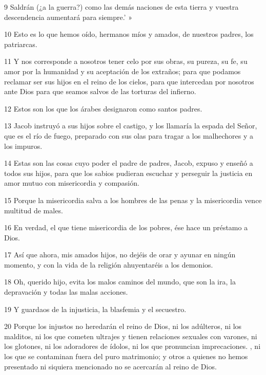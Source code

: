 \par 9 Saldrán (¿a la guerra?) como las demás naciones de esta tierra y vuestra descendencia aumentará para siempre.' »

\par 10 Esto es lo que hemos oído, hermanos míos y amados, de nuestros padres, los patriarcas.

\par 11 Y nos corresponde a nosotros tener celo por sus obras, su pureza, su fe, su amor por la humanidad y su aceptación de los extraños; para que podamos reclamar ser sus hijos en el reino de los cielos, para que intercedan por nosotros ante Dios para que seamos salvos de las torturas del infierno.

\par 12 Estos son los que los árabes designaron como santos padres.

\par 13 Jacob instruyó a sus hijos sobre el castigo, y los llamaría la espada del Señor, que es el río de fuego, preparado con sus olas para tragar a los malhechores y a los impuros.

\par 14 Estas son las cosas cuyo poder el padre de padres, Jacob, expuso y enseñó a todos sus hijos, para que los sabios pudieran escuchar y perseguir la justicia en amor mutuo con misericordia y compasión.

\par 15 Porque la misericordia salva a los hombres de las penas y la misericordia vence multitud de males.

\par 16 En verdad, el que tiene misericordia de los pobres, ése hace un préstamo a Dios.

\par 17 Así que ahora, mis amados hijos, no dejéis de orar y ayunar en ningún momento, y con la vida de la religión ahuyentaréis a los demonios.

\par 18 Oh, querido hijo, evita los malos caminos del mundo, que son la ira, la depravación y todas las malas acciones.

\par 19 Y guardaos de la injusticia, la blasfemia y el secuestro.

\par 20 Porque los injustos no heredarán el reino de Dios, ni los adúlteros, ni los malditos, ni los que cometen ultrajes y tienen relaciones sexuales con varones, ni los glotones, ni los adoradores de ídolos, ni los que pronuncian imprecaciones. , ni los que se contaminan fuera del puro matrimonio; y otros a quienes no hemos presentado ni siquiera mencionado no se acercarán al reino de Dios.

